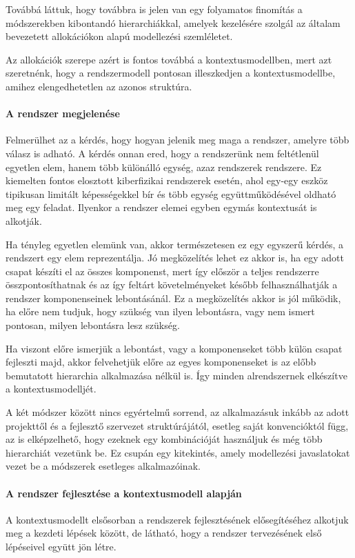             Továbbá láttuk, hogy továbbra is jelen van egy folyamatos finomítás a módszerekben kibontandó hierarchiákkal, amelyek kezelésére szolgál az általam bevezetett allokációkon alapú modellezési szemléletet.

            Az allokációk szerepe azért is fontos továbbá a kontextusmodellben, mert azt szeretnénk, hogy a rendszermodell pontosan illeszkedjen a kontextusmodellbe, amihez elengedhetetlen az azonos struktúra.

            \paragraph{A rendszer megjelenése}
            Felmerülhet az a kérdés, hogy hogyan jelenik meg maga a rendszer, amelyre több válasz is adható.
            A kérdés onnan ered, hogy a rendszerünk nem feltétlenül egyetlen elem, hanem több különálló egység, azaz rendszerek rendszere.
            Ez kiemelten fontos elosztott kiberfizikai rendszerek esetén, ahol egy-egy eszköz tipikusan limitált képességekkel bír és több egység együttműködésével oldható meg egy feladat.
            Ilyenkor a rendszer elemei egyben egymás kontextusát is alkotják.

            Ha tényleg egyetlen elemünk van, akkor természetesen ez egy egyszerű kérdés, a rendszert egy elem reprezentálja.
            Jó megközelítés lehet ez akkor is, ha egy adott csapat készíti el az összes komponenst, mert így először a teljes rendszerre összpontosíthatnak és az így feltárt követelményeket később felhasználhatják a rendszer komponenseinek lebontásánál.
            Ez a megközelítés akkor is jól működik, ha előre nem tudjuk, hogy szükség van ilyen lebontásra, vagy nem ismert pontosan, milyen lebontásra lesz szükség.

            Ha viszont előre ismerjük a lebontást, vagy a komponenseket több külön csapat fejleszti majd, akkor felvehetjük előre az egyes komponenseket is az előbb bemutatott hierarchia alkalmazása nélkül is. Így minden alrendszernek elkészítve a kontextusmodelljét.

            A két módszer között nincs egyértelmű sorrend, az alkalmazásuk inkább az adott projekttől és a fejlesztő szervezet struktúrájától, esetleg saját konvencióktól függ, az is elképzelhető, hogy ezeknek egy kombinációját használjuk és még több hierarchiát vezetünk be.
            Ez csupán egy kitekintés, amely modellezési javaslatokat vezet be a módszerek esetleges alkalmazóinak.

            \paragraph{A rendszer fejlesztése a kontextusmodell alapján}
            A kontextusmodellt elsősorban a rendszerek fejlesztésének elősegítéséhez alkotjuk meg a kezdeti lépések között, de látható, hogy a rendszer tervezésének első lépéseivel együtt jön létre.

